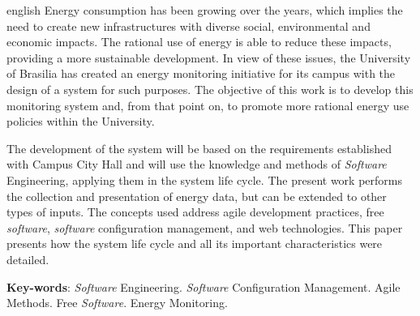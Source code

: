 \begin{resumo}[Abstract]
 \begin{otherlanguage*}{english}
   Energy consumption has been growing over the years, which implies the need to create new infrastructures with diverse social, environmental and economic impacts. The rational use of energy is able to reduce these impacts, providing a more sustainable development. In view of these issues, the University of Brasilia has created an energy monitoring initiative for its campus with the design of a system for such purposes. The objective of this work is to develop this monitoring system and, from that point on, to promote more rational energy use policies within the University.

   The development of the system will be based on the requirements established with Campus City Hall and will use the knowledge and methods of \textit{Software} Engineering, applying them in the system life cycle. The present work performs the collection and presentation of energy data, but can be extended to other types of inputs. The concepts used address agile development practices, free \textit{software}, \textit{software} configuration management, and web technologies. This paper presents how the system life cycle and all its important characteristics were detailed.

   \vspace{\onelineskip}

   \noindent
   \textbf{Key-words}: \textit{Software} Engineering. \textit{Software} Configuration Management. Agile Methods. Free \textit{Software}. Energy Monitoring.
 \end{otherlanguage*}
\end{resumo}
